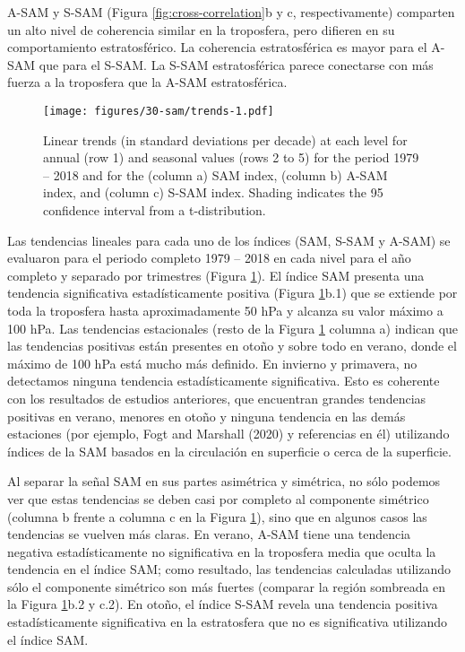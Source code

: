 \documentclass[12pt,oneside]{reedthesis}
\begin{document}
A\nobreakdash-SAM y S\nobreakdash-SAM (Figura \ref{fig:cross-correlation}b y c, respectivamente) comparten un alto nivel de coherencia similar en la troposfera, pero difieren en su comportamiento estratosférico.
La coherencia estratosférica es mayor para el A\nobreakdash-SAM que para el S\nobreakdash-SAM.
La S\nobreakdash-SAM estratosférica parece conectarse con más fuerza a la troposfera que la A\nobreakdash-SAM estratosférica.
\begin{figure}
\centering
\texttt{[image: figures/30-sam/trends-1.pdf]}
\caption{\label{fig:trends}Linear trends (in standard deviations per decade) at each level for annual (row 1) and seasonal values (rows 2 to 5) for the period 1979 -- 2018 and for the (column a) SAM index, (column b) A-SAM index, and (column c) S-SAM index. Shading indicates the 95 confidence interval from a t-distribution.}
\end{figure}
Las tendencias lineales para cada uno de los índices (SAM, S\nobreakdash-SAM y A\nobreakdash-SAM) se evaluaron para el periodo completo 1979 -- 2018 en cada nivel para el año completo y separado por trimestres (Figura \ref{fig:trends}).
El índice SAM presenta una tendencia significativa estadísticamente positiva (Figura \ref{fig:trends}b.1) que se extiende por toda la troposfera hasta aproximadamente 50 hPa y alcanza su valor máximo a 100 hPa.
Las tendencias estacionales (resto de la Figura \ref{fig:trends} columna a) indican que las tendencias positivas están presentes en otoño y sobre todo en verano, donde el máximo de 100 hPa está mucho más definido.
En invierno y primavera, no detectamos ninguna tendencia estadísticamente significativa.
Esto es coherente con los resultados de estudios anteriores, que encuentran grandes tendencias positivas en verano, menores en otoño y ninguna tendencia en las demás estaciones (por ejemplo, Fogt and Marshall (2020) y referencias en él) utilizando índices de la SAM basados en la circulación en superficie o cerca de la superficie.

Al separar la señal SAM en sus partes asimétrica y simétrica, no sólo podemos ver que estas tendencias se deben casi por completo al componente simétrico (columna b frente a columna c en la Figura \ref{fig:trends}), sino que en algunos casos las tendencias se vuelven más claras.
En verano, A\nobreakdash-SAM tiene una tendencia negativa estadísticamente no significativa en la troposfera media que oculta la tendencia en el índice SAM; como resultado, las tendencias calculadas utilizando sólo el componente simétrico son más fuertes (comparar la región sombreada en la Figura \ref{fig:trends}b.2 y c.2).
En otoño, el índice S\nobreakdash-SAM revela una tendencia positiva estadísticamente significativa en la estratosfera que no es significativa utilizando el índice SAM.
\end{document}
